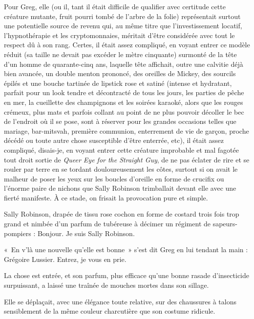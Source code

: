 Pour Greg, elle (ou il, tant il était difficile de qualifier avec certitude cette créature mutante, fruit pourri tombé de l’arbre de la folie) représentait surtout une potentielle source de revenu qui, au même titre que l’investissement locatif, l’hypnothérapie et les cryptomonnaies, méritait d’être considérée avec tout le respect dû à son rang. Certes, il était assez compliqué, en voyant entrer ce modèle réduit (sa taille ne devait pas excéder le mètre cinquante) surmonté de la tête d’un homme de quarante-cinq ans, laquelle tête affichait, outre une calvitie déjà bien avancée, un double menton prononcé, des oreilles de Mickey, des sourcils épilés et une bouche tartinée de lipstick rose et satiné (intense et hydratant, parfait pour un look tendre et décontracté de tous les jours, les parties de pêche en mer, la cueillette des champignons et les soirées karaoké, alors que les rouges crémeux, plus mats et parfois collant au point de ne plus pouvoir décoller le bec de l’endroit où il se pose, sont à réserver pour les grandes occasions telles que mariage, bar-mitsvah, première communion, enterrement de vie de garçon, proche décédé ou toute autre chose susceptible d’être enterrée, etc), il était assez compliqué, disais-je, en voyant entrer cette créature improbable et mal fagotée tout droit sortie de \textit{Queer Eye for the Straight Guy}, de ne pas éclater de rire et se rouler par terre en se tordant douloureusement les côtes, surtout si on avait le malheur de poser les yeux sur les boucles d’oreille en forme de crucifix ou l’énorme paire de nichons que Sally Robinson trimballait devant elle avec une fierté manifeste. À ce stade, on frisait la provocation pure et simple.

Sally Robinson, drapée de tissu rose cochon en forme de costard trois fois trop grand et nimbée d’un parfum de tubéreuse à décimer un régiment de sapeurs-pompiers : Bonjour. Je suis Sally Robinson.

«~En v’là une nouvelle qu’elle est bonne~» s’est dit Greg en lui tendant la main : Grégoire Lussier. Entrez, je vous en prie.

La chose est entrée, et son parfum, plus efficace qu’une bonne rasade d’insecticide surpuissant, a laissé une traînée de mouches mortes dans son sillage.

Elle se déplaçait, avec une élégance toute relative, sur des chaussures à talons sensiblement de la même couleur charcutière que son costume ridicule.

